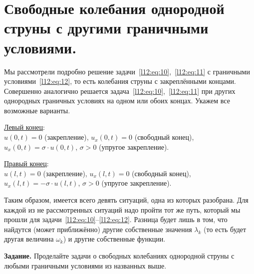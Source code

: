 \section[Свободные колебания однородной струны с другими г. у.]{Свободные колебания однородной струны с другими граничными условиями.}
\label{lecture11section4}
Мы рассмотрели подробно решение задачи~\eqref{l12:eq:10},~\eqref{l12:eq:11} с граничными условиями~\eqref{l12:eq:12}, то есть колебания струны с закреплёнными концами. Совершенно аналогично решается задача~\eqref{l12:eq:10},~\eqref{l12:eq:11} при других однородных граничных условиях на одном или обоих концах. Укажем все возможные варианты.
\vspace{0,4cm}

\noindent\underline{Левый конец}:\\[4pt]
$u(0,t)=0$ (закрепление), $u_x(0,t)=0$ (свободный конец), $u_x(0,t)=\sigma\cdot u(0,t)$, $\sigma>0$ (упругое закрепление).
\vspace{0,2cm}

\noindent\underline{Правый конец}:\\[4pt]  
$u(l,t)=0$ (закрепление), $u_x(l,t)=0$ (свободный конец), $u_x(l,t)=-\sigma\cdot u(l,t)$, $\sigma>0$ (упругое закрепление).
\vspace{0,4cm}

Таким образом, имеется всего девять ситуаций, одна из которых разобрана. Для каждой из не рассмотренных ситуаций надо пройти тот же путь, который мы прошли для задачи~\eqref{l12:eq:10}--\eqref{l12:eq:12}. Разница будет лишь в том, что найдутся (может приближённо) другие собственные значения $\lambda_k$  (то есть будет другая величина $\omega_k$) и другие собственные функции.
\vspace{0,2cm}

\noindent\textbf{Задание. }Проделайте задачи о свободных колебаниях однородной струны с любыми граничными условиями из названных выше.